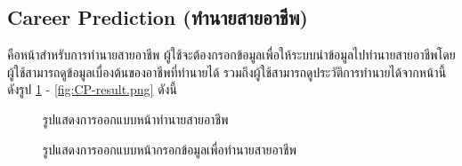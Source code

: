 \subsection{Career Prediction (ทํานายสายอาชีพ)}
คือหน้าสำหรับการทำนายสายอาชีพ ผู้ใช้จะต้องกรอกข้อมูลเพื่อให้ระบบนำข้อมูลไปทํานายสายอาชีพโดยผู้ใช้สามารถดูข้อมูลเบื่องต้นของอาชีพที่ทำนายได้ รวมถึงผู้ใช้สามารถดูประวัติการทำนายได้จากหน้านี้ ดังรูป \ref{fig:CP.png} - \ref{fig:CP-result.png} ดังนี้
\begin{figure}[H]\centering
    \caption{รูปแสดงการออกแบบหน้าทำนายสายอาชีพ}\label{fig:CP.png}
\end{figure}
\begin{figure}[H]\centering
    \caption{รูปแสดงการออกแบบหน้ากรอกข้อมูลเพื่อทำนายสายอาชีพ}\label{fig:CP-input.png}
\end{figure}
